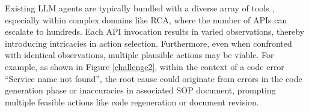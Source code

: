 

Existing LLM agents are typically bundled with a diverse array of tools \citep{qin2023toolllm}, especially within complex domains like RCA, where the number of APIs can escalate to hundreds. Each API invocation results in varied observations, thereby introducing intricacies in action selection. Furthermore, even when confronted with identical observations, multiple plausible actions may be viable. For example, as shown in Figure \ref{challenge2}, within the context of a code error ``Service name not found'', the root cause could originate from errors in the code generation phase or inaccuracies in associated SOP document, prompting multiple feasible actions like code regeneration or document revision.



